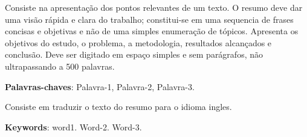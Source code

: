 \documentclass[
	12pt,				%
	openright,			%
	oneside,			%
	a4paper,			%
	chapter=TITLE,		%
	english,			%
	brazil,				%
	]{abntex2}
\renewcommand{\ABNTEXchapterfont}{\normalfont}
\begin{document}
\setlength{\absparsep}{18pt} %
\begin{resumo}
\ABNTEXchapterfont
Consiste na apresentação dos pontos relevantes de um texto. O resumo deve dar uma visão rápida e clara do trabalho; constitui-se em uma sequencia de frases concisas e objetivas e não de uma simples enumeração de tópicos. Apresenta os objetivos do estudo, o problema, a metodologia, resultados alcançados e conclusão. Deve ser digitado em espaço simples e sem parágrafos, não ultrapassando a 500 palavras.


\textbf{Palavras-chaves}: Palavra-1, Palavra-2, Palavra-3.
\end{resumo}


\begin{resumo}[Abstract]
\ABNTEXchapterfont
Consiste em traduzir o texto do resumo para o idioma ingles.


\textbf{Keywords}: word1. Word-2. Word-3.
\end{resumo}


\listoffigures*
\cleardoublepage


\listoftables*
\cleardoublepage
\end{document}
